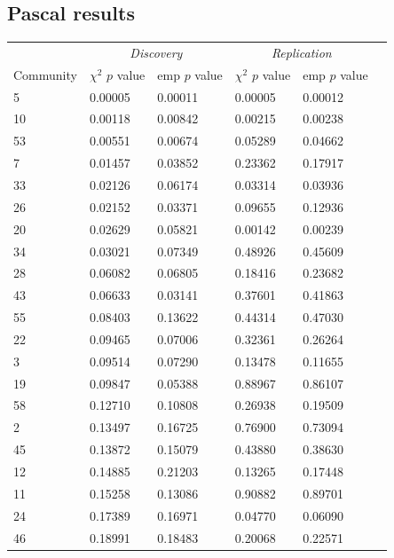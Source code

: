 \subsection{Pascal results}
\begin{table}[ht]
\centering
\setlength{\extrarowheight}{2pt}
\begin{tabular}{llllll}
  \toprule
   &  \multicolumn{2}{c}{\textit{Discovery}} & \multicolumn{2}{c}{\textit{Replication}} \\
   \cmidrule{2-5}
 Community & $\chi^2$ $p$ value  & emp $p$ value  & $\chi^2$ $p$ value   & emp $p$ value   \\ 
  \midrule
5 & 0.00005 & 0.00011 & 0.00005 & 0.00012 \\ 
  10 & 0.00118 & 0.00842 & 0.00215 & 0.00238 \\ 
  53 & 0.00551 & 0.00674 & 0.05289 & 0.04662 \\ 
  7 & 0.01457 & 0.03852 & 0.23362 & 0.17917 \\ 
  33 & 0.02126 & 0.06174 & 0.03314 & 0.03936 \\ 
  26 & 0.02152 & 0.03371 & 0.09655 & 0.12936 \\ 
  20 & 0.02629 & 0.05821 & 0.00142 & 0.00239 \\ 
  34 & 0.03021 & 0.07349 & 0.48926 & 0.45609 \\ 
  28 & 0.06082 & 0.06805 & 0.18416 & 0.23682 \\ 
  43 & 0.06633 & 0.03141 & 0.37601 & 0.41863 \\ 
  55 & 0.08403 & 0.13622 & 0.44314 & 0.47030 \\ 
  22 & 0.09465 & 0.07006 & 0.32361 & 0.26264 \\ 
  3 & 0.09514 & 0.07290 & 0.13478 & 0.11655 \\ 
  19 & 0.09847 & 0.05388 & 0.88967 & 0.86107 \\ 
  58 & 0.12710 & 0.10808 & 0.26938 & 0.19509 \\ 
  2 & 0.13497 & 0.16725 & 0.76900 & 0.73094 \\ 
  45 & 0.13872 & 0.15079 & 0.43880 & 0.38630 \\ 
  12 & 0.14885 & 0.21203 & 0.13265 & 0.17448 \\ 
  11 & 0.15258 & 0.13086 & 0.90882 & 0.89701 \\ 
  24 & 0.17389 & 0.16971 & 0.04770 & 0.06090 \\ 
  46 & 0.18991 & 0.18483 & 0.20068 & 0.22571 \\ 

\end{tabular}
\end{table}
